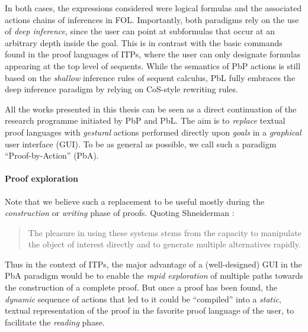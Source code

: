 In both cases, the expressions considered were logical formulas and the
associated actions chains of inferences in FOL. Importantly, both paradigms rely
on the use of \emph{deep inference}, since the user can point at subformulas
that occur at an arbitrary depth inside the goal. This is in contrast with the
basic commands found in the proof languages of ITPs, where the user can only
designate formulas appearing at the top level of sequents. While the
semantics of PbP actions is still based on the \emph{shallow} inference rules of
sequent calculus, PbL fully embraces the deep inference paradigm by relying on
CoS-style rewriting rules.

\begin{emphpar}
  All the works presented in this thesis can be seen as a direct continuation of
  the research programme initiated by PbP and PbL. The aim is to \emph{replace}
  textual proof languages with \emph{gestural} actions performed directly upon
  \emph{goals} in a \emph{graphical} user interface (GUI). To be as general as
  possible, we call such a paradigm ``Proof-by-Action'' (PbA).
\end{emphpar}

\paragraph{Proof exploration}

Note that we believe such a replacement to be useful mostly during the
\emph{construction} or \emph{writing} phase of proofs. Quoting Shneiderman
\cite{shneiderman_direct_1983}:
\begin{quote}
  The pleasure in using these systems stems from the capacity to manipulate the
object of interest directly and to generate multiple alternatives rapidly.
\end{quote}
Thus in the context of ITPs, the major advantage of a (well-designed) GUI in the
PbA paradigm would be to enable the \emph{rapid exploration} of multiple paths
towards the construction of a complete proof. But once a proof has been found,
the \emph{dynamic} sequence of actions that led to it could be ``compiled'' into
a \emph{static}, textual representation of the proof in the favorite proof
language of the user, to facilitate the \emph{reading} phase.

